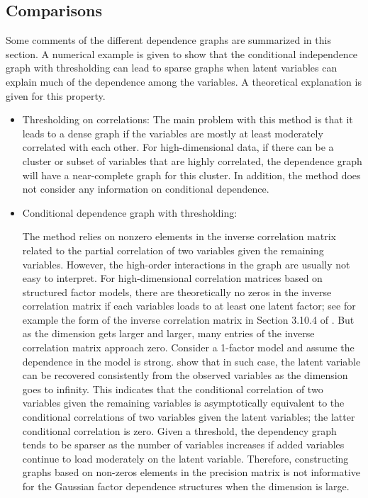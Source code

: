 \documentclass[a4paper]{article}
\begin{document}
\subsection{Comparisons}
\label{sec-comparisons}

Some comments of the different dependence graphs are summarized in this section. A numerical
example is given to show that the conditional independence graph with thresholding can lead to
sparse graphs when latent variables can explain much of the dependence among the variables.
A theoretical explanation is given for this property.

\begin{itemize}
    \item Thresholding on correlations: 
    The main problem with this method is that it leads to a dense graph if the variables are mostly at least moderately correlated with each other. For high-dimensional data, if there can be a cluster or subset of variables that are highly correlated, the dependence graph will have a near-complete graph for this cluster. In addition, the method does not consider any information on conditional dependence.
    \item Conditional dependence graph with thresholding:
    
   The method relies on nonzero elements in the inverse correlation matrix
  related to the partial correlation of two variables given the
  remaining variables.  However, the high-order interactions in the
  graph are usually not easy to interpret.  For high-dimensional
  correlation matrices based on structured factor models, there are
  theoretically no zeros in the inverse correlation matrix if each
  variables loads to at least one latent factor; see for example the
  form of the inverse correlation matrix in Section 3.10.4 of
  \cite{Joe2014}.  But as the dimension gets larger and larger, many
  entries of the inverse correlation matrix approach zero.  Consider a
  1-factor model and assume the dependence in the model is
  strong. \citep{fan2022high} show that in such case, the latent
  variable can be recovered consistently from the observed variables
  as the dimension goes to infinity.  This indicates that the
  conditional correlation of two variables given the remaining
  variables is asymptotically equivalent to the conditional
  correlations of two variables given the latent variables; the latter
  conditional correlation is zero.  Given a threshold, the dependency
  graph tends to be sparser as the number of variables increases if
  added variables continue to load moderately on the latent variable.
  Therefore, constructing graphs based on non-zeros elements in the
  precision matrix is not informative for the Gaussian factor
  dependence structures when the dimension is large.
    

\end{itemize}
\end{document}
